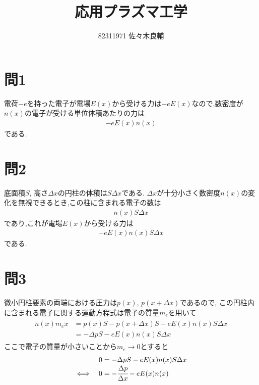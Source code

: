 \documentclass[uplatex,a4j,11pt,dvipdfmx]{jsarticle}
\begin{document}
\title{応用プラズマ工学}
\author{82311971 佐々木良輔}
\date{}
\maketitle
\section*{問1}
電荷$-e$を持った電子が電場$E(x)$から受ける力は$-eE(x)$なので,数密度が$n(x)$の電子が受ける単位体積あたりの力は
\begin{align}
  -eE(x)n(x)
\end{align}
である.
\section*{問2}
底面積$S$, 高さ$\Delta x$の円柱の体積は$S\Delta x$である.
$\Delta x$が十分小さく数密度$n(x)$の変化を無視できるとき,この柱に含まれる電子の数は
\begin{align}
  n(x)S\Delta x
\end{align}
であり,これが電場$E(x)$から受ける力は
\begin{align}
  -eE(x)n(x)S\Delta x
\end{align}
である.
\section*{問3}
微小円柱要素の両端における圧力は$p(x)$, $p(x+\Delta x)$であるので,
この円柱内に含まれる電子に関する運動方程式は電子の質量$m_e$を用いて
\begin{align}
  \begin{split}
    n(x)m_e\ddot{x}&=p(x)S-p(x+\Delta x)S-eE(x)n(x)S\Delta x\\
    &=-\Delta pS-eE(x)n(x)S\Delta x
  \end{split}
\end{align}
ここで電子の質量が小さいことから$m_e\rightarrow0$とすると
\begin{align}
  \begin{array}{cl}
    &0=-\Delta pS-eE(x)n(x)S\Delta x\\
    \iff&0=-\cfrac{\Delta p}{\Delta x}-eE(x)n(x)
  \end{array}
\end{align}
\end{document}
